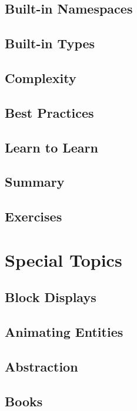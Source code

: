 \documentclass[oneside]{book}
\begin{document}
\section{Built-in Namespaces}
\blindtext

\section{Built-in Types}
\blindtext

\section{Complexity}
\blindtext

\section{Best Practices}
\blindtext

\section{Learn to Learn}
\blindtext

\section{Summary}
\blindtext

\section{Exercises}
\blindtext

\chapter{Special Topics}
\blindtext

\section{Block Displays}
\blindtext

\section{Animating Entities}
\blindtext

\section{Abstraction}
\blindtext

\section{Books}
\blindtext
\end{document}
